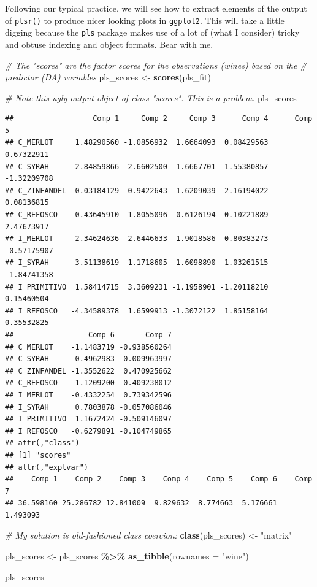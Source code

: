 \documentclass[
]{book}
\newenvironment{Shaded}{\begin{snugshade}}{\end{snugshade}}
\newcommand{\AttributeTok}[1]{\textcolor[rgb]{0.13,0.29,0.53}{#1}}
\newcommand{\CommentTok}[1]{\textcolor[rgb]{0.56,0.35,0.01}{\textit{#1}}}
\newcommand{\FunctionTok}[1]{\textcolor[rgb]{0.13,0.29,0.53}{\textbf{#1}}}
\newcommand{\NormalTok}[1]{#1}
\newcommand{\OtherTok}[1]{\textcolor[rgb]{0.56,0.35,0.01}{#1}}
\newcommand{\SpecialCharTok}[1]{\textcolor[rgb]{0.81,0.36,0.00}{\textbf{#1}}}
\newcommand{\StringTok}[1]{\textcolor[rgb]{0.31,0.60,0.02}{#1}}
\begin{document}
Following our typical practice, we will see how to extract elements of the output of \texttt{plsr()} to produce nicer looking plots in \texttt{ggplot2}. This will take a little digging because the \texttt{pls} package makes use of a lot of (what I consider) tricky and obtuse indexing and object formats. Bear with me.

\begin{Shaded}
\begin{Highlighting}[]
\CommentTok{\# The "scores" are the factor scores for the observations (wines) based on the}
\CommentTok{\# predictor (DA) variables}
\NormalTok{pls\_scores }\OtherTok{\textless{}{-}} \FunctionTok{scores}\NormalTok{(pls\_fit)}

\CommentTok{\# Note this ugly output object of class "scores".  This is a problem.}
\NormalTok{pls\_scores}
\end{Highlighting}
\end{Shaded}

\begin{verbatim}
##                  Comp 1     Comp 2     Comp 3      Comp 4      Comp 5
## C_MERLOT     1.48290560 -1.0856932  1.6664093  0.08429563  0.67322911
## C_SYRAH      2.84859866 -2.6602500 -1.6667701  1.55380857 -1.32209708
## C_ZINFANDEL  0.03184129 -0.9422643 -1.6209039 -2.16194022  0.08136815
## C_REFOSCO   -0.43645910 -1.8055096  0.6126194  0.10221889  2.47673917
## I_MERLOT     2.34624636  2.6446633  1.9018586  0.80383273 -0.57175907
## I_SYRAH     -3.51138619 -1.1718605  1.6098890 -1.03261515 -1.84741358
## I_PRIMITIVO  1.58414715  3.3609231 -1.1958901 -1.20118210  0.15460504
## I_REFOSCO   -4.34589378  1.6599913 -1.3072122  1.85158164  0.35532825
##                 Comp 6       Comp 7
## C_MERLOT    -1.1483719 -0.938560264
## C_SYRAH      0.4962983 -0.009963997
## C_ZINFANDEL -1.3552622  0.470925662
## C_REFOSCO    1.1209200  0.409238012
## I_MERLOT    -0.4332254  0.739342596
## I_SYRAH      0.7803878 -0.057086046
## I_PRIMITIVO  1.1672424 -0.509146097
## I_REFOSCO   -0.6279891 -0.104749865
## attr(,"class")
## [1] "scores"
## attr(,"explvar")
##    Comp 1    Comp 2    Comp 3    Comp 4    Comp 5    Comp 6    Comp 7 
## 36.598160 25.286782 12.841009  9.829632  8.774663  5.176661  1.493093
\end{verbatim}

\begin{Shaded}
\begin{Highlighting}[]
\CommentTok{\# My solution is old{-}fashioned class coercion: }
\FunctionTok{class}\NormalTok{(pls\_scores) }\OtherTok{\textless{}{-}} \StringTok{"matrix"}

\NormalTok{pls\_scores }\OtherTok{\textless{}{-}} 
\NormalTok{  pls\_scores }\SpecialCharTok{\%\textgreater{}\%} 
  \FunctionTok{as\_tibble}\NormalTok{(}\AttributeTok{rownames =} \StringTok{"wine"}\NormalTok{)}

\NormalTok{pls\_scores}
\end{Highlighting}
\end{Shaded}
\end{document}
